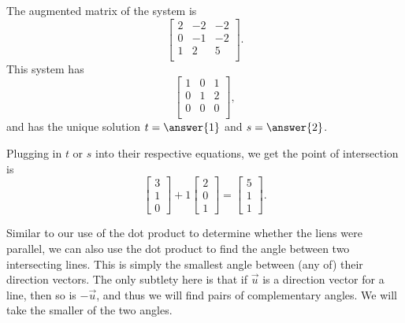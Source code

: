 \documentclass{ximera}
\begin{document}
\begin{solution}
  The
  augmented matrix of the system is
  \begin{equation*}
    \begin{bmatrix}
      2 & -2 & -2 \\
      0 & -1 & -2 \\
      1 & 2 & 5   \\
    \end{bmatrix}.
  \end{equation*}
  This system has {\rref}
  \begin{equation*}
    \begin{bmatrix}
      1 & 0 & 1 \\
      0 & 1 & 2 \\
      0 & 0 & 0 \\
    \end{bmatrix},
  \end{equation*}
  and has the unique solution $t=\answer{1}$ and $s=\answer{2}$.
  
 Plugging in $t$ or $s$ into their respective equations, we get the point of intersection is
  \begin{equation*}
    \begin{bmatrix} 3 \\ 1 \\ 0 \end{bmatrix}
    + 1 \begin{bmatrix} 2 \\ 0 \\ 1 \end{bmatrix}
    = \begin{bmatrix} 5 \\ 1 \\ 1 \end{bmatrix}.
  \end{equation*}
\end{solution}


Similar to our use of the dot product to determine whether the liens were parallel, we can also use the dot product to find the angle between two intersecting
lines. This is simply the smallest angle between (any of) their
direction vectors. The only subtlety here is that if $\vec{u}$ is a
direction vector for a line, then so is $-\vec{u}$, and thus we will
find pairs of complementary angles. We will take the smaller of the
two angles.

\begin{center} 
\end{center}
\end{document}
